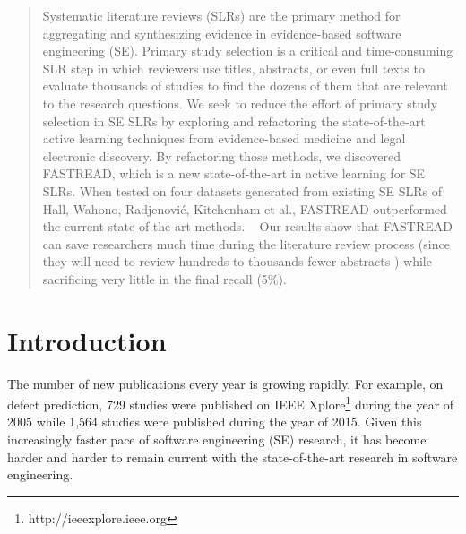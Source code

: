 \documentclass{svjour3}
\theoremstyle{break}
\newcommand{\respto}[1]{
\fcolorbox{black}{black!15}{
\label{response:#1}
\bf
  \scriptsize R-{#1}}~
}
\begin{document}
\begin{abstract}
  
Systematic literature reviews (SLRs) are the primary method for aggregating and synthesizing evidence in evidence-based software engineering (SE). Primary study selection is a critical and time-consuming SLR step in which reviewers use
titles, abstracts, or even full texts to evaluate thousands of studies to find the dozens of them that are relevant to the research questions. We seek to reduce the effort of primary study selection in SE SLRs by exploring and refactoring the state-of-the-art active learning techniques from evidence-based medicine and legal electronic discovery. By refactoring those methods, we discovered FASTREAD, which is a new state-of-the-art in active learning for SE SLRs. When tested on four datasets generated from existing SE SLRs of Hall, Wahono, Radjenovi{\'c}, Kitchenham et al., FASTREAD outperformed the current state-of-the-art methods. \respto{2e1}Our results show that FASTREAD can save researchers much time during
 the literature review process (since they will need to review hundreds to thousands fewer abstracts ) 
 while sacrificing very little
in the final recall  (5\%).


\end{abstract}



\section{Introduction}
\label{sect: Introduction}

The number of new publications every year is growing rapidly. For example, on defect
prediction, 729 studies were published on IEEE
Xplore\footnote{http://ieeexplore.ieee.org} during the year of 2005 while 1,564
studies were published during the year of 2015.
Given this increasingly faster pace of software engineering (SE) research,
it has become harder and harder to remain current with
the state-of-the-art research in software engineering.
\end{document}
